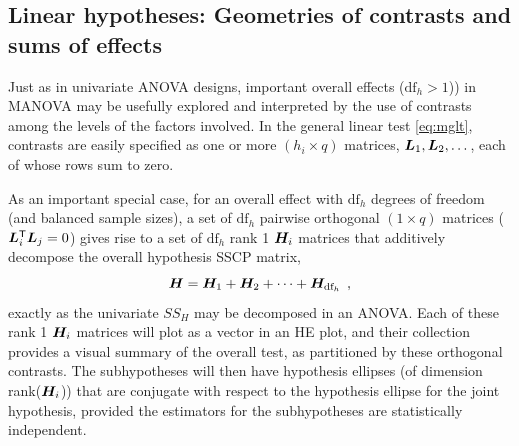 \subsection{Linear hypotheses: Geometries of contrasts and sums of effects}

Just as in univariate ANOVA designs, important overall effects ($\textrm{df}_h>1$)) in MANOVA may be usefully
explored and interpreted by the use of contrasts among the levels of the factors involved.
In the general linear test \eqref{eq:mglt}, contrasts are easily specified as one or more $(h_i \times q)$ 
matrices, $\bm{L}_1, \bm{L}_2, \dots $, each of whose rows sum to zero.

As an important special case,
for an overall effect with
$\textrm{df}_h$ degrees of freedom (and balanced sample sizes), a set of $\textrm{df}_h$ pairwise orthogonal $(1 \times q)$
 matrices ($\bm{L}_i ^\mathsf{T} \bm{L}_j =0$) gives rise to a set of $\textrm{df}_h$ rank 1 $\bm{H}_i$
matrices that additively decompose the overall hypothesis SSCP matrix,
\begin{equation*}
\bm{H} = \bm{H}_1 + \bm{H}_2 + \cdots + \bm{H}_{\textrm{df}_h}
\:\: ,
\end{equation*}
exactly as the univariate $SS_H$ may be decomposed in an ANOVA.  Each of these rank 1 $\bm{H}_i$ matrices
will plot as a vector in an HE plot, and their collection provides a visual summary of the overall
test, as partitioned by these orthogonal contrasts.
The subhypotheses will then have hypothesis ellipses (of dimension rank($\bm{H}_i$)) 
that are conjugate with respect to the hypothesis ellipse for the joint hypothesis, provided the 
estimators for the subhypotheses are statistically independent.



